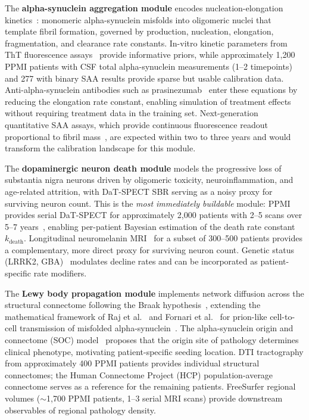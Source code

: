 The \textbf{alpha-synuclein aggregation module} encodes nucleation-elongation kinetics~\cite{knowles2009,dear2020,meisl2014,cohen2012}: monomeric alpha-synuclein misfolds into oligomeric nuclei that template fibril formation, governed by production, nucleation, elongation, fragmentation, and clearance rate constants. In-vitro kinetic parameters from ThT fluorescence assays~\cite{knowles2009,meisl2014} provide informative priors, while approximately 1,200 PPMI patients with CSF total alpha-synuclein measurements (1--2 timepoints) and 277 with binary SAA results provide sparse but usable calibration data. Anti-alpha-synuclein antibodies such as prasinezumab~\cite{pagano2022,pagano2024} enter these equations by reducing the elongation rate constant, enabling simulation of treatment effects without requiring treatment data in the training set. Next-generation quantitative SAA assays, which provide continuous fluorescence readout proportional to fibril mass~\cite{shahnawaz2023}, are expected within two to three years and would transform the calibration landscape for this module.

The \textbf{dopaminergic neuron death module} models the progressive loss of substantia nigra neurons driven by oligomeric toxicity, neuroinflammation, and age-related attrition, with DaT-SPECT SBR serving as a noisy proxy for surviving neuron count. This is the \textit{most immediately buildable} module: PPMI provides serial DaT-SPECT for approximately 2,000 patients with 2--5 scans over 5--7 years~\cite{marek2011}, enabling per-patient Bayesian estimation of the death rate constant $k_\text{death}$. Longitudinal neuromelanin MRI~\cite{xing2021} for a subset of 300--500 patients provides a complementary, more direct proxy for surviving neuron count. Genetic status (LRRK2, GBA)~\cite{simuni2020lrrk2} modulates decline rates and can be incorporated as patient-specific rate modifiers.

The \textbf{Lewy body propagation module} implements network diffusion across the structural connectome following the Braak hypothesis~\cite{braak2003}, extending the mathematical framework of Raj et al.~\cite{raj2012,raj2019} and Fornari et al.~\cite{fornari2019} for prion-like cell-to-cell transmission of misfolded alpha-synuclein~\cite{brundin2010}. The alpha-synuclein origin and connectome (SOC) model~\cite{horsager2022} proposes that the origin site of pathology determines clinical phenotype, motivating patient-specific seeding location. DTI tractography from approximately 400 PPMI patients provides individual structural connectomes; the Human Connectome Project (HCP) population-average connectome serves as a reference for the remaining patients. FreeSurfer regional volumes ($\sim$1,700 PPMI patients, 1--3 serial MRI scans) provide downstream observables of regional pathology density.

